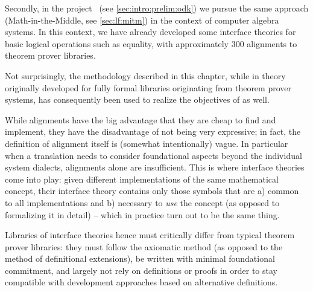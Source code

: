 Secondly, in the \ODK project~\cite{DehKohKon:iop16,OpenDreamKit:on} (see \autoref{sec:intro:prelim:odk}) we pursue the same approach (Math-in-the-Middle, see \autoref{sec:lf:mitm}) in the context of computer algebra systems.
In this context, we have already developed some interface theories for basic logical operations such as equality, with approximately 300 alignments to theorem prover libraries.

Not surprisingly, the methodology described in this chapter, while in theory originally developed for fully formal libraries originating from theorem prover systems, has consequently been used to realize the objectives of \ODK as well.
\medskip
%
%

While alignments have the big advantage that they are cheap to find and implement, they have the disadvantage of not being very expressive; in fact, the definition of alignment itself is (somewhat intentionally) vague. %
In particular when a translation needs to consider foundational aspects beyond the individual system dialects, alignments alone are insufficient. This is where interface theories come into play: given different implementations of the same mathematical concept, their interface theory contains only those symbols that are a) common to all implementations and b) necessary to \emph{use} the concept (as opposed to formalizing it in detail)  -- which in practice turn out to be the same thing.

Libraries of interface theories hence must critically differ from typical theorem prover libraries: they must follow the axiomatic method (as opposed to the method of definitional extensions), be written with minimal foundational commitment, and largely not rely on definitions or proofs in order to stay compatible with development approaches based on alternative definitions.

